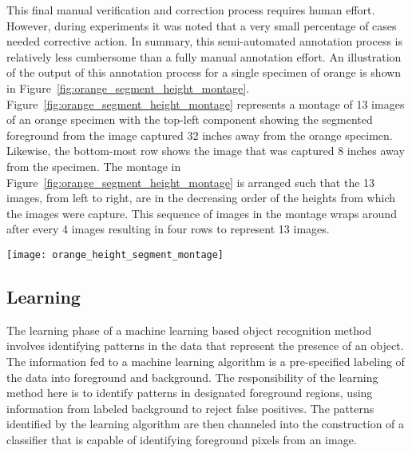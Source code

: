 This final manual verification and correction process requires human effort. However, during experiments it was noted that a very small percentage of cases needed corrective action. In summary, this semi-automated annotation process is relatively less cumbersome than a fully manual annotation effort. An illustration of the output of this annotation process for a single specimen of orange is shown in Figure~\ref{fig:orange_segment_height_montage}. Figure~\ref{fig:orange_segment_height_montage} represents a montage of 13 images of an orange specimen with the top-left component showing the segmented foreground from the image captured 32 inches away from the orange specimen. Likewise, the bottom-most row shows the image that was captured 8 inches away from the specimen. The montage in Figure~\ref{fig:orange_segment_height_montage} is arranged such that the 13 images, from left to right, are in the decreasing order of the heights from which the images were capture. This sequence of images in the montage wraps 
around after 
every 4 images resulting in four rows to represent 13 images.
%
\begin{figure*}
  \centering
  \texttt{[image: orange\_height\_segment\_montage]}
  \caption[Annotation output for a single specimen]{The output of the annotation process showing a montage of the segmented foreground from a set of 13 images that belong to a single orange specimen. The left-top montage component is the image of the orange specimen captured 32 inches from the ground. The montage components arranged from left to right (with wrap-around after every 4 images) to progressively show images that were captured closer to the orange specimen. The closest image that was captured is 8 inches away from the specimen and is shown in the bottom-most row.} 
  \label{fig:orange_segment_height_montage}
\end{figure*}	
%


\subsection{Learning}


The learning phase of a machine learning based object recognition method involves identifying patterns in the data that represent the presence of an object. The information fed to a machine learning algorithm is a pre-specified labeling of the data into foreground and background. The responsibility of the learning method here is to identify patterns in designated foreground regions, using information from labeled background to reject false positives. The patterns identified by the learning algorithm are then channeled into the construction of a classifier that is capable of identifying foreground pixels from an image.

